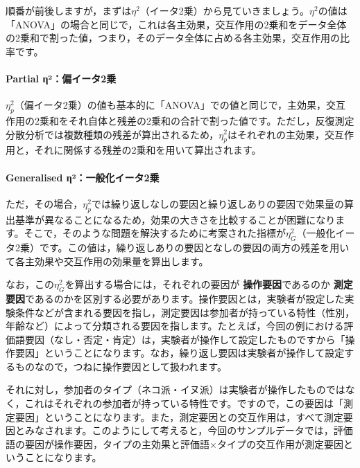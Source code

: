 \documentclass[
  12pt,
  a5jpaper,
  lualatex, ja=standard]{bxjsbook}
\renewcommand{\emph}[1]{\textbf{\color{emph} #1}}
\begin{document}
順番が前後しますが，まずは\(\eta^2\)（イータ2乗）から見ていきましょう。\(\eta^2\)の値は「ANOVA」の場合と同じで，これは各主効果，交互作用の2乗和をデータ全体の2乗和で割った値，つまり，そのデータ全体に占める各主効果，交互作用の比率です。

\hypertarget{partial-ux3b7uxb2ux504fux30a4ux30fcux30bf2ux4e57}{%
\paragraph*{Partial η²：偏イータ2乗}\label{partial-ux3b7uxb2ux504fux30a4ux30fcux30bf2ux4e57}}

\(\eta^2_p\)（偏イータ2乗）の値も基本的に「ANOVA」での値と同じで，主効果，交互作用の2乗和をそれ自体と残差の2乗和の合計で割った値です。ただし，反復測定分散分析では複数種類の残差が算出されるため，\(\eta^2_p\)はそれぞれの主効果，交互作用と，それに関係する残差の2乗和を用いて算出されます。

\hypertarget{generalised-ux3b7uxb2ux4e00ux822cux5316ux30a4ux30fcux30bf2ux4e57}{%
\paragraph*{Generalised η²：一般化イータ2乗}\label{generalised-ux3b7uxb2ux4e00ux822cux5316ux30a4ux30fcux30bf2ux4e57}}

ただ，その場合，\(\eta^2_p\)では繰り返しなしの要因と繰り返しありの要因で効果量の算出基準が異なることになるため，効果の大きさを比較することが困難になります。そこで，そのような問題を解決するために考案された指標が\(\eta^2_G\)（一般化イータ2乗）です。この値は，繰り返しありの要因となしの要因の両方の残差を用いて各主効果や交互作用の効果量を算出します。

なお，この\(\eta^2_G\)を算出する場合には，それぞれの要因が\emph{操作要因}であるのか\emph{測定要因}であるのかを区別する必要があります。操作要因とは，実験者が設定した実験条件などが含まれる要因を指し，測定要因は参加者が持っている特性（性別，年齢など）によって分類される要因を指します。たとえば，今回の例における評価語要因（なし・否定・肯定）は，実験者が操作して設定したものですから「操作要因」ということになります。なお，繰り返し要因は実験者が操作して設定するものなので，つねに操作要因として扱われます。

それに対し，参加者のタイプ（ネコ派・イヌ派）は実験者が操作したものではなく，これはそれぞれの参加者が持っている特性です。ですので，この要因は「測定要因」ということになります。また，測定要因との交互作用は，すべて測定要因とみなされます。このようにして考えると，今回のサンプルデータでは，評価語の要因が操作要因，タイプの主効果と評価語×タイプの交互作用が測定要因ということになります。
\end{document}
